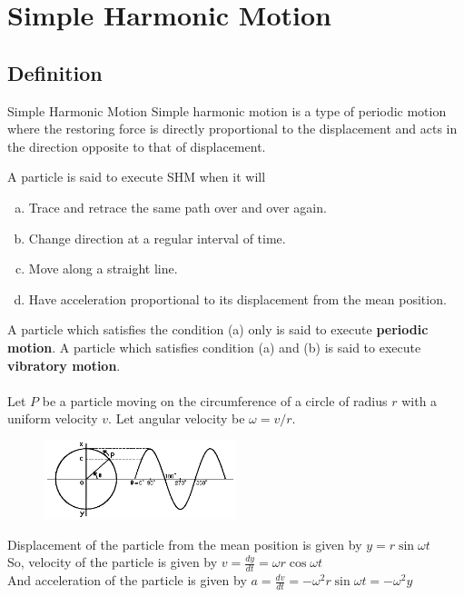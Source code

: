 \documentclass[12pt]{article}
\numberwithin{equation}{subsection}
\begin{document}
\section{Simple Harmonic Motion}
\subsection{Definition}

\begin{definition}{Simple Harmonic Motion}{}
    Simple harmonic motion is a type of periodic motion where the restoring force is directly proportional to the displacement and acts in the direction opposite to that of displacement.
\end{definition}

A particle is said to execute SHM when it will
\begin{enumerate}[(a)]
    \item Trace and retrace the same path over and over again.
    \item Change direction at a regular interval of time.
    \item Move along a straight line.
    \item Have acceleration proportional to its displacement from the mean position.
\end{enumerate}

A particle which satisfies the condition (a) only is said to execute \textbf{periodic motion}. A particle which satisfies condition (a) and (b) is said to execute \textbf{vibratory motion}. \\~\\

Let $P$ be a particle moving on the circumference of a circle of radius $r$ with a uniform velocity $v$. Let angular velocity be $\omega = v/r$.

\begin{figure}[htpb]
    \centering
    \includegraphics[width=0.5\textwidth]{1.png}
\end{figure}

\vspace{20pt}
Displacement of the particle from the mean position is given by $\displaystyle y = r \sin{\omega t}$\\
So, velocity of the particle is given by $\displaystyle v = \frac{dy}{dt} = \omega r \cos{\omega t}$\\
And acceleration of the particle is given by $\displaystyle a = \frac{dv}{dt} = -\omega^2 r \sin{\omega t} = -\omega^2 y$
\end{document}
